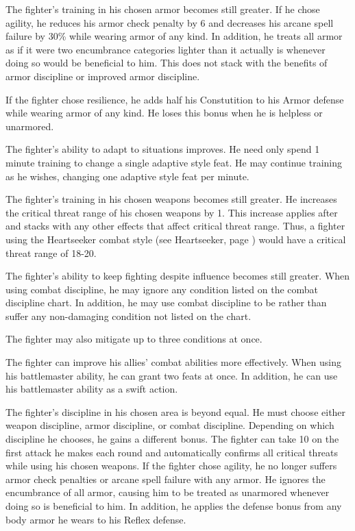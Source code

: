 The fighter's training in his chosen armor becomes still greater.
If he chose agility, he reduces his armor check penalty by 6 and decreases his arcane spell failure by 30\% while wearing armor of any kind.
In addition, he treats all armor as if it were two encumbrance categories lighter than it actually is whenever doing so would be beneficial to him.
This does not stack with the benefits of armor discipline or improved armor discipline.

If the fighter chose resilience, he adds half his Constutition to his Armor defense while wearing armor of any kind.
He loses this bonus when he is helpless or unarmored.

The fighter's ability to adapt to situations improves.
He need only spend 1 minute training to change a single adaptive style feat.
He may continue training as he wishes, changing one adaptive style feat per minute.

The fighter's training in his chosen weapons becomes still greater.
He increases the critical threat range of his chosen weapons by 1.
This increase applies after and stacks with any other effects that affect critical threat range.
Thus, a fighter using the Heartseeker combat style (see Heartseeker, page ) would have a critical threat range of 18-20.

The fighter's ability to keep fighting despite influence becomes still greater.
When using combat discipline, he may ignore any condition listed on the combat discipline chart.
In addition, he may use combat discipline to be \dazed rather than suffer any non-damaging condition not listed on the chart.

\par The fighter may also mitigate up to three conditions at once.

The fighter can improve his allies' combat abilities more effectively.
When using his battlemaster ability, he can grant two feats at once.
In addition, he can use his battlemaster ability as a swift action.

The fighter's discipline in his chosen area is beyond equal.
He must choose either weapon discipline, armor discipline, or combat discipline.
Depending on which discipline he chooses, he gains a different bonus.
The fighter can take 10 on the first attack he makes each round and automatically confirms all critical threats while using his chosen weapons.
If the fighter chose agility, he no longer suffers armor check penalties or arcane spell failure with any armor.
He ignores the encumbrance of all armor, causing him to be treated as unarmored whenever doing so is beneficial to him.
In addition, he applies the defense bonus from any body armor he wears to his Reflex defense.

